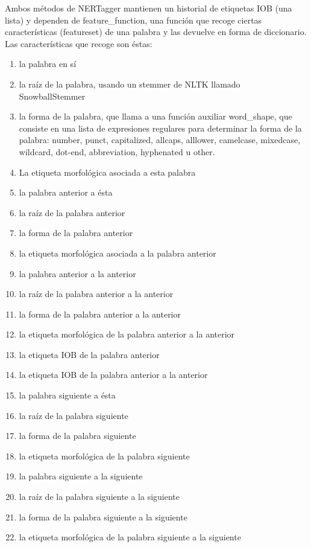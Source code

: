 \documentclass{pre-tfg}
\begin{document}
Ambos métodos de NERTagger mantienen un historial de etiquetas IOB (una lista) y dependen de feature\_function, una función que recoge ciertas características (featureset) de una palabra y las devuelve en forma de diccionario. Las características que recoge son éstas:

\begin{enumerate}
	\item la palabra en sí
	\item la raíz de la palabra, usando un stemmer de NLTK llamado SnowballStemmer
	\item la forma de la palabra, que llama a una función auxiliar word\_shape, que consiste en una lista de expresiones regulares para determinar la forma de la palabra: number, punct, capitalized, allcaps, alllower, camelcase, mixedcase, wildcard, dot-end, abbreviation, hyphenated u other.
	\item La etiqueta morfológica asociada a esta palabra
	\item la palabra anterior a ésta
	\item la raíz de la palabra anterior
	\item la forma de la palabra anterior
	\item la etiqueta morfológica asociada a la palabra anterior
	\item la palabra anterior a la anterior
	\item la raíz de la palabra anterior a la anterior
	\item la forma de la palabra anterior a la anterior
	\item la etiqueta morfológica de la palabra anterior a la anterior
	\item la etiqueta IOB de la palabra anterior
	\item la etiqueta IOB de la palabra anterior a la anterior
	\item la palabra siguiente a ésta
	\item la raíz de la palabra siguiente
	\item la forma de la palabra siguiente
	\item la etiqueta morfológica de la palabra siguiente
	\item la palabra siguiente a la siguiente
	\item la raíz de la palabra siguiente a la siguiente
	\item la forma de la palabra siguiente a la siguiente
	\item la etiqueta morfológica de la palabra siguiente a la siguiente
\end{enumerate}
\end{document}
